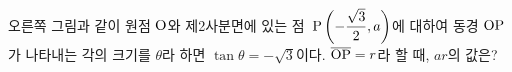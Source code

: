 \noindent\begin{minipage}[t]{0.58\linewidth}\vspace{0pt}\raggedright 오른쪽 그림과 같이 원점 $\mathrm{O}$와 제2사분면에 있는 점~$\mathrm{P}\left(-\dfrac{\sqrt{3}}{2}{,}\mkern3mu\mathopen{}a\right)$에 대하여 동경 $\mathrm{OP}$가 나타내는 각의 크기를 $\theta$라 하면 $\tan\theta=-\sqrt{3}$이다. $\overline{\mathrm{OP}}=r$라 할 때, $ar$의 값은?\end{minipage}\hfill\begin{minipage}[t]{0.4\linewidth}\vspace{0pt}\centering \resizebox{\ifdim\width>\linewidth\linewidth\else\width\fi}{!}{}\end{minipage}\par
{}
